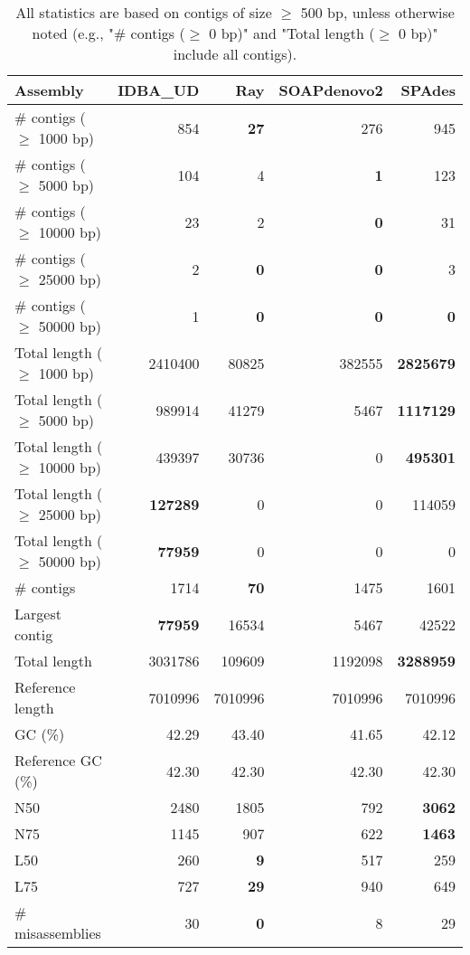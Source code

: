 \documentclass[12pt,a4paper]{article}
\begin{document}
\begin{table}[ht]
\begin{center}
\caption{All statistics are based on contigs of size $\geq$ 500 bp, unless otherwise noted (e.g., "\# contigs ($\geq$ 0 bp)" and "Total length ($\geq$ 0 bp)" include all contigs).}
\begin{tabular}{|l*{4}{|r}|}
\hline
Assembly & IDBA\_UD & Ray & SOAPdenovo2 & SPAdes \\ \hline
\# contigs ($\geq$ 1000 bp) & 854 & {\bf 27} & 276 & 945 \\ \hline
\# contigs ($\geq$ 5000 bp) & 104 & 4 & {\bf 1} & 123 \\ \hline
\# contigs ($\geq$ 10000 bp) & 23 & 2 & {\bf 0} & 31 \\ \hline
\# contigs ($\geq$ 25000 bp) & 2 & {\bf 0} & {\bf 0} & 3 \\ \hline
\# contigs ($\geq$ 50000 bp) & 1 & {\bf 0} & {\bf 0} & {\bf 0} \\ \hline
Total length ($\geq$ 1000 bp) & 2410400 & 80825 & 382555 & {\bf 2825679} \\ \hline
Total length ($\geq$ 5000 bp) & 989914 & 41279 & 5467 & {\bf 1117129} \\ \hline
Total length ($\geq$ 10000 bp) & 439397 & 30736 & 0 & {\bf 495301} \\ \hline
Total length ($\geq$ 25000 bp) & {\bf 127289} & 0 & 0 & 114059 \\ \hline
Total length ($\geq$ 50000 bp) & {\bf 77959} & 0 & 0 & 0 \\ \hline
\# contigs & 1714 & {\bf 70} & 1475 & 1601 \\ \hline
Largest contig & {\bf 77959} & 16534 & 5467 & 42522 \\ \hline
Total length & 3031786 & 109609 & 1192098 & {\bf 3288959} \\ \hline
Reference length & 7010996 & 7010996 & 7010996 & 7010996 \\ \hline
GC (\%) & 42.29 & 43.40 & 41.65 & 42.12 \\ \hline
Reference GC (\%) & 42.30 & 42.30 & 42.30 & 42.30 \\ \hline
N50 & 2480 & 1805 & 792 & {\bf 3062} \\ \hline
N75 & 1145 & 907 & 622 & {\bf 1463} \\ \hline
L50 & 260 & {\bf 9} & 517 & 259 \\ \hline
L75 & 727 & {\bf 29} & 940 & 649 \\ \hline
\# misassemblies & 30 & {\bf 0} & 8 & 29 \\ \hline

\end{tabular}
\end{center}
\end{table}
\end{document}
